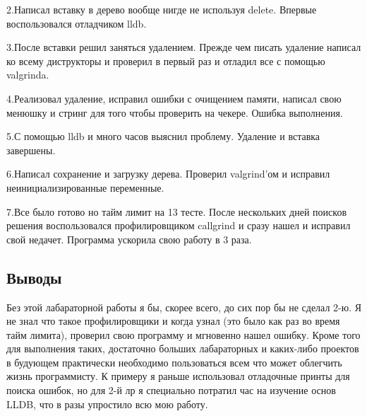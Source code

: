 \documentclass[12pt]{article}
\begin{document}
2.Написал вставку в дерево вообще нигде не используя delete. Впервые воспользовался отладчиком lldb.

3.После вставки решил заняться удалением. Прежде чем писать удаление написал ко всему диструкторы и проверил в 
первый раз и отладил все с помощью valgrinda.

4.Реализовал удаление, исправил ошибки с очищением памяти, написал свою менюшку и стринг для того чтобы проверить на чекере. Ошибка выполнения.

5.С помощью lldb и много часов выяснил проблему. Удаление и вставка завершены.

6.Написал сохранение и загрузку дерева. Проверил valgrind'ом и исправил неинициализированные переменные.

7.Все было готово но тайм лимит на 13 тесте. После нескольких дней поисков решения воспользовался профилировщиком 
callgrind и сразу нашел и исправил свой недачет. Программа ускорила свою работу в 3 раза.


\subsection*{Выводы}

Без этой лабараторной работы я бы, скорее всего, до сих пор бы не сделал 2-ю. Я не знал что такое профилировщики и когда узнал (это было как раз во время тайм лимита), проверил свою программу и мгновенно нашел ошибку. Кроме того для выполнения таких, достаточно больших лабараторных и каких-либо проектов в будующем практически необходимо пользоваться всем что может облегчить жизнь программисту. К примеру я раньше использовал отладочные принты для поиска ошибок, но для 2-й лр я специально потратил час на изучение основ LLDB, что в разы упростило всю мою работу.
\end{document}

